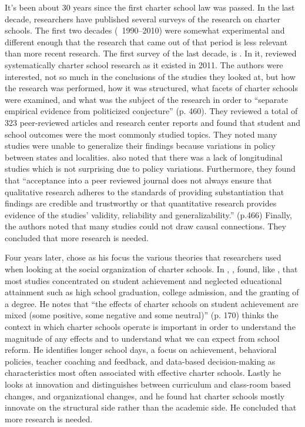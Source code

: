 It's been about 30 years since the first charter school law was passed. In the last decade, researchers have published several surveys of the research on charter schools. The first two decades (~1990–2010) were somewhat experimental and different enough that the research that came out of that period is less relevant than more recent research. The first survey of the last decade, is .  In it, \textcite{Smith.etal2011} reviewed systematically charter school research as it existed in 2011. The authors were interested, not so much in the conclusions of the studies they looked at, but how the research was performed, how it was structured, what facets of charter schools were examined, and what was the subject of the research in order to ``separate empirical evidence from politicized conjecture'' (p. 460). They reviewed a total of 323 peer-reviewed articles and research center reports and found that student and school outcomes were the most commonly studied topics. They noted many studies were unable to generalize their findings because variations in policy between states and localities. \citeauthor{Smith.etal2011} also noted that there was a lack of longitudinal studies which is not surprising due to policy variations. Furthermore, they found that ``acceptance into a peer reviewed journal does not always ensure that qualitative research adheres to the standards of providing substantiation that findings are credible and trustworthy or that quantitative research provides evidence of the studies' validity, reliability and generalizability.'' (p.466) Finally, the authors noted that many studies could not draw causal connections. They concluded that more research is needed. %

Four years later, \textcite{Berends2015} chose as his focus the various theories that researchers used when looking at the social organization of charter schools. In , \textcite{Berends2015}, found, like \citeauthor{Smith.etal2011}, that most studies concentrated on student achievement and neglected educational attainment such as high school graduation, college admission, and the granting of a degree. He notes that ``the effects of charter schools on student achievement are mixed (some positive, some negative and some neutral)'' (p. 170) \citeauthor{Berends2015} thinks the context in which charter schools operate is important in order to understand the magnitude of any effects and to understand what we can expect from school reform. He identifies longer school days, a focus on achievement, behavioral policies, teacher coaching and feedback, and data-based decision-making as characteristics most often associated with effective charter schools. Lastly he looks at innovation and distinguishes between curriculum and class-room based changes, and organizational changes, and he found hat charter schools mostly innovate on the structural side rather than the academic side. He concluded that more research is needed.

